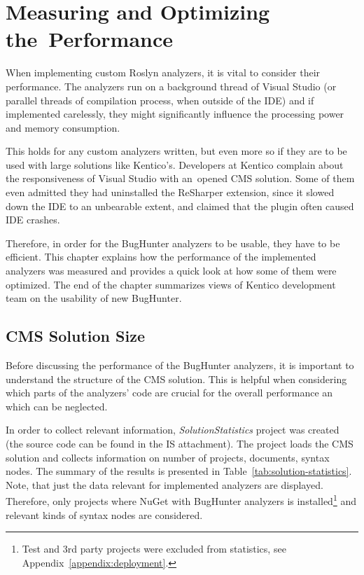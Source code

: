 \documentclass[
  digital, %
  table,   %
  lof,     %
  lot,     %
  oneside,
]{fithesis3}
\begin{document}
\chapter{Measuring and Optimizing the~Performance}
\label{chap:performance}
When implementing custom Roslyn analyzers, it is vital to consider their performance. The analyzers run on a background thread of Visual Studio (or parallel threads of compilation process, when outside of the IDE) and if implemented carelessly, they might significantly influence the processing power and memory consumption.

 This holds for any custom analyzers written, but even more so if they are to be used with large solutions like Kentico's. Developers at Kentico complain about the responsiveness of Visual Studio with an~opened CMS solution. Some of them even admitted they had uninstalled the ReSharper extension, since it slowed down the IDE to an unbearable extent, and claimed that the plugin often caused IDE crashes. 

Therefore, in order for the BugHunter analyzers to be usable, they have to be efficient. This chapter explains how the performance of the implemented analyzers was measured and provides a quick look at how some of them were optimized. The end of the chapter summarizes views of Kentico development team on the usability of new BugHunter.

\section{CMS Solution Size}
Before discussing the performance of the BugHunter analyzers, it is important to understand the structure of the CMS solution. This is helpful when considering which parts of the analyzers' code are crucial for the overall performance an which can be neglected.

In order to collect relevant information, \textit{SolutionStatistics} project was created (the source code can be found in the IS attachment). The project loads the CMS solution and collects information on number of projects, documents, syntax nodes. The summary of the results is presented in Table~\ref{tab:solution-statistics}. Note, that just the data relevant for implemented analyzers are displayed. Therefore, only projects where NuGet with BugHunter analyzers is installed\footnote{Test and 3rd party projects were excluded from statistics, see Appendix~\ref{appendix:deployment}.} and relevant kinds of syntax nodes are considered.
\end{document}
